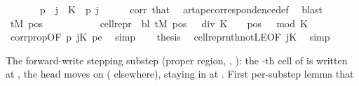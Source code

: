 \begin{isabellebody}
\ \ \ \ \ {\isachardoublequoteopen}{}\ {\isasymle}\ p{\isachardoublequoteclose}\ \ {\isachardoublequoteopen}j\ {\isacharless}{\kern0pt}\ {\isacharquery}{\kern0pt}K{\isachardoublequoteclose}\ \ p\ j\isanewline
\ \ \ \ \isamarkupfalse%
\ corr\ that\ \isamarkupfalse%
\ ar{\isacharunderscore}{\kern0pt}tape{\isacharunderscore}{\kern0pt}correspondence{\isacharunderscore}{\kern0pt}def\ \isamarkupfalse%
\ blast\isanewline
\ \ \isamarkupfalse%
\ {\isachardoublequoteopen}tM{\isacharprime}{\kern0pt}\ pos\isanewline
\ \ \ \ \ \ \ \ \ \ {\isacharequal}{\kern0pt}\ cell{\isacharunderscore}{\kern0pt}repr\ {\isasymGamma}\ bl\ {\isacharparenleft}{\kern0pt}tM\ {\isacharparenleft}{\kern0pt}{\isacharparenleft}{\kern0pt}pos\ {\isacharminus}{\kern0pt}\ {}{\isacharparenright}{\kern0pt}\ div\ {\isacharquery}{\kern0pt}K\ {\isacharplus}{\kern0pt}\ {}{\isacharparenright}{\kern0pt}{\isacharparenright}{\kern0pt}\ {\isacharbang}{\kern0pt}\ {\isacharparenleft}{\kern0pt}{\isacharparenleft}{\kern0pt}pos\ {\isacharminus}{\kern0pt}\ {}{\isacharparenright}{\kern0pt}\ mod\ {\isacharquery}{\kern0pt}K{\isacharparenright}{\kern0pt}{\isachardoublequoteclose}\isanewline
\ \ \ \ \isamarkupfalse%
\ corrprop{\isacharbrackleft}{\kern0pt}OF\ p{}\ jK{\isacharbrackright}{\kern0pt}\ pe\ \isamarkupfalse%
\ simp\isanewline
\ \ \isamarkupfalse%
\ {\isacharquery}{\kern0pt}thesis\ \isamarkupfalse%
\ cell{\isacharunderscore}{\kern0pt}repr{\isacharunderscore}{\kern0pt}nth{\isacharunderscore}{\kern0pt}not{\isacharunderscore}{\kern0pt}LE{}{\isacharbrackleft}{\kern0pt}OF\ jK{\isacharbrackright}{\kern0pt}\ \isamarkupfalse%
\ simp\isanewline
{}\isamarkupfalse%
%
\endisatagproof
{\isafoldproof}%
%
\isadelimproof
%
\endisadelimproof
%
\begin{isamarkuptext}%
The forward-write stepping substep (proper region,
  , ): the -th cell of
   is written at , the head moves
   on  ( elsewhere), staying in
   at .  First per-substep lemma that

\end{isamarkuptext}
\end{isabellebody}
